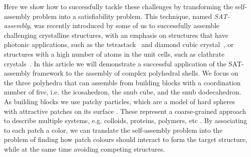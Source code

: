 \documentclass[a4paper, amsfonts, amssymb, amsmath, reprint, showkeys, nofootinbib, oneside]{revtex4-1}
\begin{document}
Here we show how to successfully tackle these challenges by transforming the self-assembly problem into a satisfiability problem. This technique, named \emph{SAT-assembly}, was recently introduced by some of us to successfully assemble challenging crystalline structures,
with an emphasis on structures that have photonic applications, such as the tetrastack~\cite{Romano2020a} and diamond cubic crystal~\textcolor{blue}{\cite{Romano2020a,Russo2022,rovigatti2022simple}}, or structures with a high number of atoms in the unit cells, such as clathrate crystals~\cite{Romano2020a}.
In this article we will demonstrate a successful application of the SAT-assembly framework to the assembly of complex polyhedral shells. We focus on the three polyhedra that can assemble from building blocks with a  coordination number of five, i.e. the icosahedron, the snub cube, and the snub dodecahedron.
As building blocks we use patchy particles, which are a model of hard spheres with attractive patches on its surface \cite{Bianchi2006, Romano2010, Rovigatti2018, Russo2021, Sciortino2009}. These represent a coarse-grained approach to describe multiple systems, e.g. colloids, proteins, polymers, etc \cite{Sacanna2011, Wang2012}.
By associating to each patch a color, we can translate the self-assembly problem into the problem of finding how patch colours should interact to form the target structure, while at the same time avoiding competing structures.
\end{document}
